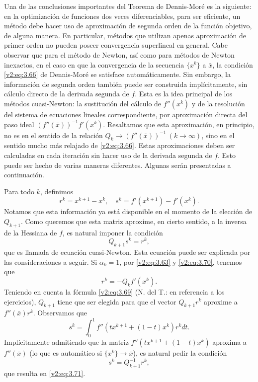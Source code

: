 Una de las conclusiones importantes del Teorema de Dennis-Moré es la siguiente: en la optimización de funciones dos veces diferenciables, para ser eficiente, un método debe hacer uso de aproximación de segunda orden de la función objetivo, de alguna manera. En particular, métodos que utilizan apenas aproximación de primer orden no pueden poseer convergencia superlineal en general. Cabe observar que para el método de Newton, así como para métodos de Newton inexactos, en el caso en que la convergencia de la secuencia $\{x^k\}$ a $\bar{x}$, la condición \eqref{v2:eq:3.66} de Dennis-Moré se satisface automáticamente. Sin embargo, la información de segunda orden también puede ser construida implícitamente, sin cálculo directo de la derivada segunda de $f$. Esta es la idea principal de los métodos cuasi-Newton: la sustitución del cálculo de $f''(x^k)$ y de la resolución del sistema de ecuaciones lineales correspondiente, por aproximación directa del paso ideal $(f''(\bar{x}))^{-1} f'(x^k)$. Resaltamos que esta aproximación, en principio, no es en el sentido de la relación $Q_k \to (f''(\bar{x}))^{-1} \ (k \to \infty)$, sino en el sentido mucho más relajado de \eqref{v2:eq:3.66}. Estas aproximaciones deben ser calculadas en cada iteración sin hacer uso de la derivada segunda de $f$. Esto puede ser hecho de varias maneras diferentes. Algunas serán presentadas a continuación.

Para todo $k$, definimos
\begin{equation}
    r^k = x^{k+1} - x^k, \quad s^k = f'(x^{k+1}) - f'(x^k).
    \label{v2:eq:3.70}
\end{equation}
Notamos que esta información ya está disponible en el momento de la elección de $Q_{k+1}$. Como queremos que esta matriz aproxime, en cierto sentido, a la inversa de la Hessiana de $f$, es natural imponer la condición
\begin{equation}
    Q_{k+1} s^k = r^k,
    \label{v2:eq:3.71}
\end{equation}
que es llamada de ecuación cuasi-Newton. Esta ecuación puede ser explicada por las consideraciones a seguir. Si $\alpha_k = 1$, por \eqref{v2:eq:3.63} y \eqref{v2:eq:3.70}, tenemos que
\[
    r^k = -Q_k f'(x^k).
\]
Teniendo en cuenta la fórmula \eqref{v2:eq:3.69} (N. del T.: en referencia a los ejercicios), $Q_{k+1}$ tiene que ser elegida para que el vector $Q_{k+1} r^k$ aproxime a $f''(\bar{x}) r^k$. Observamos que
\[
    s^k = \int_0^1 f''(t x^{k+1} + (1-t)x^k)r^k dt.
\]
Implícitamente admitiendo que la matriz $f''(t x^{k+1} + (1-t)x^k)$ aproxima a $f''(\bar{x})$ (lo que es automático si $\{x^k\} \to \bar{x}$), es natural pedir la condición
\[
    s^k = Q_{k+1}^{-1} r^k,
\]
que resulta en \eqref{v2:eq:3.71}.

